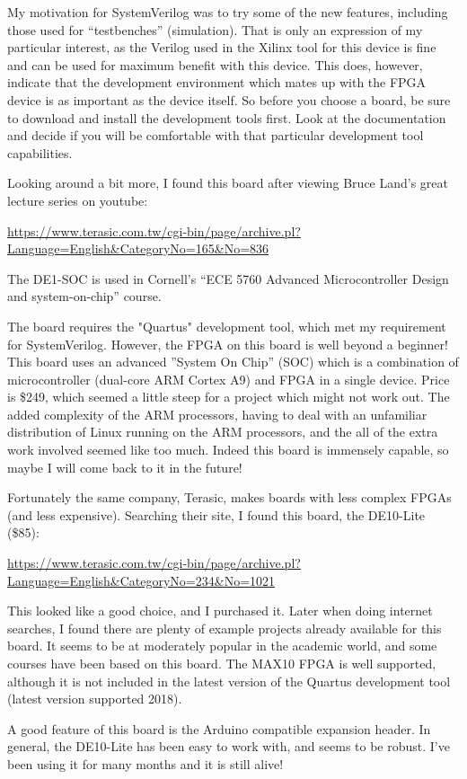 My motivation for SystemVerilog was to try some of the new features, including those used for ``testbenches'' (simulation).  That is only an expression of my particular interest, as the Verilog used in the Xilinx tool for this device is fine and can be used for maximum benefit with this device.  This does, however, indicate that the development environment which mates up with the FPGA device is as important as the device itself.  So before you choose a board, be sure to download and install the development tools first.  Look at the documentation and decide if you will be comfortable with that particular development tool capabilities.

Looking around a bit more, I found this board after viewing Bruce Land's great lecture series on youtube:

\begin{small}
\url{https://www.terasic.com.tw/cgi-bin/page/archive.pl?Language=English&CategoryNo=165&No=836}
\end{small}

The DE1-SOC is used in Cornell's ``ECE 5760 Advanced Microcontroller Design and system-on-chip'' course.

The board requires the "Quartus" development tool, which met my requirement for SystemVerilog.  However, the FPGA on this board is well beyond a beginner!  This board uses an advanced ''System On Chip'' (SOC) which is a combination of microcontroller (dual-core ARM Cortex A9) and FPGA in a single device.  Price is \$249, which seemed a little steep for a project which might not work out.  The added complexity of the ARM processors, having to deal with an unfamiliar distribution of Linux running on the ARM processors, and the all of the extra work involved seemed like too much.  Indeed this board is immensely capable, so maybe I will come back to it in the future!

Fortunately the same company, Terasic, makes boards with less complex FPGAs (and less expensive).  Searching their site, I found this board, the DE10-Lite (\$85):

\begin{footnotesize}
\url{https://www.terasic.com.tw/cgi-bin/page/archive.pl?Language=English&CategoryNo=234&No=1021}
\end{footnotesize}

This looked like a good choice, and I purchased it.  Later when doing internet searches, I found there are plenty of example projects already available for this board.  It seems to be at moderately popular in the academic world, and some courses have been based on this board.  The MAX10 FPGA is well supported, although it is not included in the latest version of the Quartus development tool (latest version supported 2018).

A good feature of this board is the Arduino compatible expansion header.  In general, the DE10-Lite has been easy to work with, and seems to be robust.  I've been using it for many months and it is still alive!



